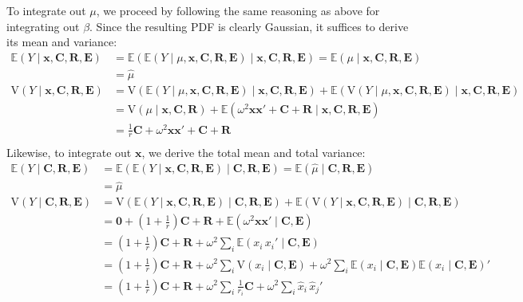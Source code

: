 \documentclass[12pt]{article}
\newcommand{\Esp}{\mathbb E}
\newcommand{\Var}{\textrm{V}}
\newcommand{\x}{\boldsymbol{x}}
\newcommand{\E}{\mathbf{E}}
\begin{document}
\begin{appendix}[A]
To integrate out $\mu$, we proceed by following the same reasoning as above for integrating out $\beta$. Since the resulting PDF is clearly Gaussian, it suffices to derive its mean and variance:
\begin{equation} 
\label{appA5}
\begin{array}{ll}
\Esp(Y\mid \x,\mathbf{C}, \mathbf{R},\E)&=\Esp\left(\Esp(Y\mid \mu, \x,\mathbf{C}, \mathbf{R},\E)\mid \x,\mathbf{C}, \mathbf{R},\E\right)=\Esp\left(\mu\mid \x,\mathbf{C}, \mathbf{R},\E\right)\\
&=\widehat{\mu}\\
\Var(Y\mid \x,\mathbf{C}, \mathbf{R},\E)&=\Var\left(\Esp(Y\mid \mu, \x,\mathbf{C}, \mathbf{R},\E)\mid \x,\mathbf{C}, \mathbf{R},\E\right)+\Esp\left(\Var(Y\mid \mu, \x,\mathbf{C}, \mathbf{R},\E)\mid \x,\mathbf{C}, \mathbf{R},\E\right)\\
&=\Var\left(\mu\mid \x,\mathbf{C}, \mathbf{R}\right)+\Esp\left(\omega^2\x\x'+\mathbf C+\mathbf R\mid \x,\mathbf{C}, \mathbf{R},\E\right)\\
&=\frac{1}{r}\mathbf C+\omega^2\x\x'+\mathbf C+\mathbf R\\
\end{array}
\end{equation}
Likewise, to integrate out $\x$, we derive the total mean and total variance:
\begin{equation} 
\label{modelcov1}
\begin{array}{ll}
\Esp(Y\mid \mathbf{C}, \mathbf{R},\E)&=\Esp\left(\Esp(Y\mid \x,\mathbf{C}, \mathbf{R},\E)\mid \mathbf{C}, \mathbf{R},\E\right)=\Esp\left(\widehat{\mu}\mid \mathbf{C}, \mathbf{R},\E\right)\\
&=\widehat{\mu}\\
\Var(Y\mid \mathbf{C}, \mathbf{R},\E)&=\Var\left(\Esp(Y\mid \x, \mathbf{C}, \mathbf{R},\E)\mid \mathbf{C}, \mathbf{R},\E\right)+\Esp\left(\Var(Y\mid \x, \mathbf{C}, \mathbf{R},\E)\mid \mathbf{C}, \mathbf{R},\E\right)\\
&=\mathbf 0 +(1+\frac{1}{r})\mathbf{C}+\mathbf R+\Esp\left( \omega^2\x\x'\mid \mathbf{C},\E\right)\\
&=(1+\frac{1}{r})\mathbf{C}+\mathbf R+\omega^2\sum_{i}\Esp\left( x_i\,x_i'\mid \mathbf{C},\E\right)\\
&=(1+\frac{1}{r})\mathbf{C}+\mathbf R+\omega^2\sum_{i}\Var\left( x_i\mid \mathbf{C},\E\right)+\omega^2\sum_{i}\Esp\left( x_i\mid \mathbf{C},\E\right)\Esp\left( x_i\mid \mathbf{C},\E\right)'\\
&=(1+\frac{1}{r})\mathbf{C}+\mathbf R+\omega^2\sum_{i}\frac{1}{r_i}\mathbf C+\omega^2\sum_{i}\widehat{x}_i\,\widehat{x}_j'\\

\end{array}
\end{equation}
\end{appendix}
\end{document}
